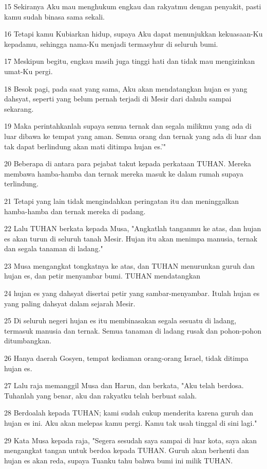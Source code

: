 \par 15 Sekiranya Aku mau menghukum engkau dan rakyatmu dengan penyakit, pasti kamu sudah binasa sama sekali.
\par 16 Tetapi kamu Kubiarkan hidup, supaya Aku dapat menunjukkan kekuasaan-Ku kepadamu, sehingga nama-Ku menjadi termasyhur di seluruh bumi.
\par 17 Meskipun begitu, engkau masih juga tinggi hati dan tidak mau mengizinkan umat-Ku pergi.
\par 18 Besok pagi, pada saat yang sama, Aku akan mendatangkan hujan es yang dahsyat, seperti yang belum pernah terjadi di Mesir dari dahulu sampai sekarang.
\par 19 Maka perintahkanlah supaya semua ternak dan segala milikmu yang ada di luar dibawa ke tempat yang aman. Semua orang dan ternak yang ada di luar dan tak dapat berlindung akan mati ditimpa hujan es.'"
\par 20 Beberapa di antara para pejabat takut kepada perkataan TUHAN. Mereka membawa hamba-hamba dan ternak mereka masuk ke dalam rumah supaya terlindung.
\par 21 Tetapi yang lain tidak mengindahkan peringatan itu dan meninggalkan hamba-hamba dan ternak mereka di padang.
\par 22 Lalu TUHAN berkata kepada Musa, "Angkatlah tanganmu ke atas, dan hujan es akan turun di seluruh tanah Mesir. Hujan itu akan menimpa manusia, ternak dan segala tanaman di ladang."
\par 23 Musa mengangkat tongkatnya ke atas, dan TUHAN menurunkan guruh dan hujan es, dan petir menyambar bumi. TUHAN mendatangkan
\par 24 hujan es yang dahsyat disertai petir yang sambar-menyambar. Itulah hujan es yang paling dahsyat dalam sejarah Mesir.
\par 25 Di seluruh negeri hujan es itu membinasakan segala sesuatu di ladang, termasuk manusia dan ternak. Semua tanaman di ladang rusak dan pohon-pohon ditumbangkan.
\par 26 Hanya daerah Gosyen, tempat kediaman orang-orang Israel, tidak ditimpa hujan es.
\par 27 Lalu raja memanggil Musa dan Harun, dan berkata, "Aku telah berdosa. Tuhanlah yang benar, aku dan rakyatku telah berbuat salah.
\par 28 Berdoalah kepada TUHAN; kami sudah cukup menderita karena guruh dan hujan es ini. Aku akan melepas kamu pergi. Kamu tak usah tinggal di sini lagi."
\par 29 Kata Musa kepada raja, "Segera sesudah saya sampai di luar kota, saya akan mengangkat tangan untuk berdoa kepada TUHAN. Guruh akan berhenti dan hujan es akan reda, supaya Tuanku tahu bahwa bumi ini milik TUHAN.
